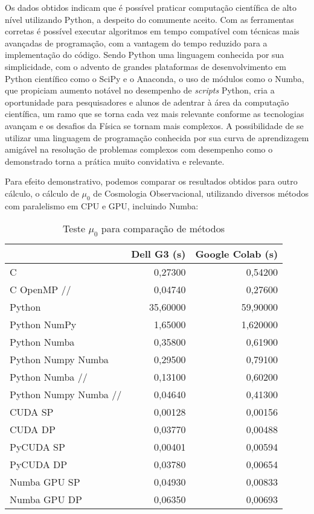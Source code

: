 \documentclass[
	12pt,				%
	a4paper,			%
	english,			%
	openright,				%
	brazil,				%
	oneside]{abntex2}
\begin{document}
	Os dados obtidos indicam que é possível praticar computação científica de alto nível utilizando Python, a despeito do comumente aceito. Com as ferramentas corretas é possível executar algoritmos em tempo compatível com técnicas mais avançadas de programação, com a vantagem do tempo reduzido para a implementação do código. Sendo Python uma linguagem conhecida por sua simplicidade, com o advento de grandes plataformas de desenvolvimento em Python científico como o SciPy e o Anaconda, o uso de módulos como o Numba, que propiciam aumento notável no desempenho de \textit{scripts} Python, cria a oportunidade para pesquisadores e alunos de adentrar à área da computação científica, um ramo que se torna cada vez mais relevante conforme as tecnologias avançam e os desafios da Física se tornam mais complexos. A possibilidade de se utilizar uma linguagem de programação conhecida por sua curva de aprendizagem amigável na resolução de problemas complexos com desempenho como o demonstrado torna a prática muito convidativa e relevante.
	
	Para efeito demonstrativo, podemos comparar os resultados obtidos para outro cálculo, o cálculo de $\mu_0$ de Cosmologia Observacional, utilizando diversos métodos com paralelismo em CPU e GPU, incluindo Numba:
	
	\begin{table}[h]
		\begin{center}
			\begin{tabular}{lrr}
				\hline
				& Dell G3 (s) & Google Colab (s) \\
				\hline
				C & 0,27300 & 0,54200 \\
				C OpenMP //& 0,04740 & 0,27600 \\
				Python & 35,60000 & 59,90000 \\
				Python NumPy & 1,65000 & 1,620000 \\
				Python Numba  & 0,35800 & 0,61900 \\
				Python Numpy Numba & 0,29500 & 0,79100 \\
				Python Numba // & 0,13100 & 0,60200 \\
				Python Numpy Numba // & 0,04640 &  0,41300\\
				CUDA SP & 0,00128 & 0,00156 \\
				CUDA DP &0,03770  & 0,00488 \\
				PyCUDA SP &0,00401  &  0,00594\\
				PyCUDA DP &  0,03780&  0,00654\\
				Numba GPU SP &0,04930  &0,00833  \\
				Numba GPU DP & 0,06350 & 0,00693 \\
				
				\hline
			\end{tabular}
		\end{center}
		\vspace{-.1cm}
		\caption{Teste $\mu_0$ para comparação de métodos}
	\end{table}
	
\end{document}
